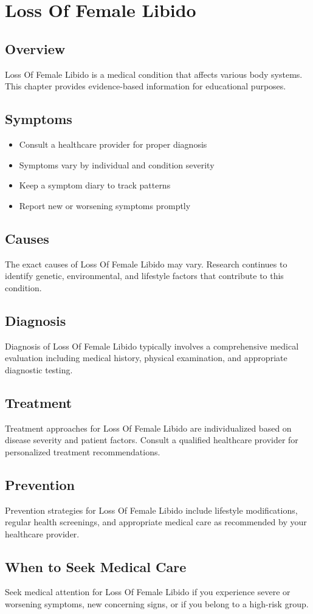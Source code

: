 \chapter{Loss Of Female Libido}

\section*{Overview}
Loss Of Female Libido is a medical condition that affects various body systems. This chapter provides evidence-based information for educational purposes.

\section*{Symptoms}
\begin{itemize}
  \item Consult a healthcare provider for proper diagnosis
  \item Symptoms vary by individual and condition severity
  \item Keep a symptom diary to track patterns
  \item Report new or worsening symptoms promptly
\end{itemize}

\section*{Causes}
The exact causes of Loss Of Female Libido may vary. Research continues to identify genetic, environmental, and lifestyle factors that contribute to this condition.

\section*{Diagnosis}
Diagnosis of Loss Of Female Libido typically involves a comprehensive medical evaluation including medical history, physical examination, and appropriate diagnostic testing.

\section*{Treatment}
Treatment approaches for Loss Of Female Libido are individualized based on disease severity and patient factors. Consult a qualified healthcare provider for personalized treatment recommendations.

\section*{Prevention}
Prevention strategies for Loss Of Female Libido include lifestyle modifications, regular health screenings, and appropriate medical care as recommended by your healthcare provider.

\section*{When to Seek Medical Care}
Seek medical attention for Loss Of Female Libido if you experience severe or worsening symptoms, new concerning signs, or if you belong to a high-risk group.
\clearpage
